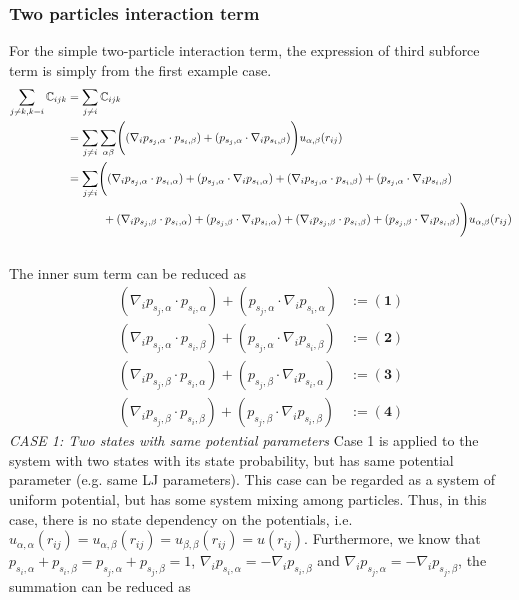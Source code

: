 \documentclass[11pt, oneside]{article}   	%
\begin{document}
\subsubsection{Two particles interaction term}
For the simple two-particle interaction term, the expression of third subforce term is simply from the first example case.
\begin{align}
\sum_{j \neq k, k=i} \mathbb{C}_{ijk} & = \sum_{j\neq i} \mathbb{C}_{ijk} \\ \notag
&=  \sum_{j \neq i} \sum_{\alpha \beta} \Biggl( (\nabla_i p_{s_j,\alpha} \cdot p_{s_i,\beta}) + (p_{s_j,\alpha} \cdot \nabla_i p_{s_i,\beta}) \Biggr)  u_{\alpha, \beta} (r_{ij}) \\ \notag
&=  \sum_{j \neq i} \Biggl( (\nabla_i p_{s_j,\alpha} \cdot p_{s_i,\alpha}) + (p_{s_j,\alpha} \cdot \nabla_i p_{s_i,\alpha}) +(\nabla_i p_{s_j,\alpha} \cdot p_{s_i,\beta}) + (p_{s_j,\alpha} \cdot \nabla_i p_{s_i,\beta}) \\ \notag
& \quad \quad \quad \,+(\nabla_i p_{s_j,\beta} \cdot p_{s_i,\alpha}) + (p_{s_j,\beta} \cdot \nabla_i p_{s_i,\alpha}) +(\nabla_i p_{s_j,\beta} \cdot p_{s_i,\beta}) + (p_{s_j,\beta} \cdot \nabla_i p_{s_i,\beta}) \Biggr)  u_{\alpha, \beta} (r_{ij}) \\ \notag
\end{align}
The inner sum term can be reduced as
\begin{align}
(\nabla_i p_{s_j,\alpha} \cdot p_{s_i,\alpha}) + (p_{s_j,\alpha} \cdot \nabla_i p_{s_i,\alpha}) &:= \mathbf{(1)} \\
(\nabla_i p_{s_j,\alpha} \cdot p_{s_i,\beta}) + (p_{s_j,\alpha} \cdot \nabla_i p_{s_i,\beta}) & := \mathbf{(2)} \\
(\nabla_i p_{s_j,\beta} \cdot p_{s_i,\alpha}) + (p_{s_j,\beta} \cdot \nabla_i p_{s_i,\alpha}) & := \mathbf{(3)} \\
(\nabla_i p_{s_j,\beta} \cdot p_{s_i,\beta}) + (p_{s_j,\beta} \cdot \nabla_i p_{s_i,\beta}) & := \mathbf{(4)} 
\end{align}
\textit{CASE 1: Two states with same potential parameters}	Case 1 is applied to the system with two states with its state probability, but has same potential parameter (e.g. same LJ parameters). This case can be regarded as a system of uniform potential, but has some system mixing among particles. Thus, in this case, there is no state dependency on the potentials, i.e.  $ u_{\alpha, \alpha} (r_{ij}) =  u_{\alpha, \beta} (r_{ij}) =  u_{\beta, \beta} (r_{ij})=u(r_{ij})$.
Furthermore, we know that $p_{s_i,\alpha} + p_{s_i,\beta}= p_{s_j,\alpha} + p_{s_j,\beta} = 1$, $\nabla_i p_{s_i,\alpha} = - \nabla_i p_{s_i,\beta}$ and $\nabla_i p_{s_j,\alpha} = - \nabla_i p_{s_j,\beta}$, the summation can be reduced as 
\end{document}
